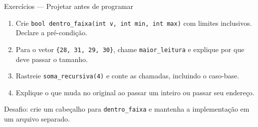 \begin{frame}{Exercícios — Projetar antes de programar}
\begin{enumerate}
\item Crie \texttt{bool dentro\_faixa(int v, int min, int max)} com limites inclusivos. Declare a pré-condição.
\item Para o vetor \texttt{\{28, 31, 29, 30\}}, chame \texttt{maior\_leitura} e explique por que deve passar o tamanho.
\item Rastreie \texttt{soma\_recursiva(4)} e conte as chamadas, incluindo o caso-base.
\item Explique o que muda no original ao passar um inteiro ou passar seu endereço.
\end{enumerate}
\small Desafio: crie um cabeçalho para \texttt{dentro\_faixa} e mantenha a implementação em um arquivo separado.
\end{frame}
